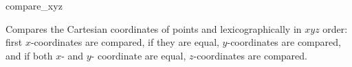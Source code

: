 \begin{ccRefFunction}{compare_xyz}

      {Compares the Cartesian coordinates of points  and
        lexicographically in $xyz$ order: first 
       $x$-coordinates are compared, if they are equal, $y$-coordinates
       are compared, and if both $x$- and $y$- coordinate are equal,
       $z$-coordinates are compared.}

\ccSeeAlso

 \\
 \\
 \\
 \\
 \\
 \\
 \\

\end{ccRefFunction}

